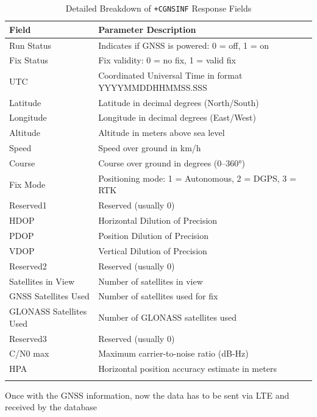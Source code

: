\begin{table}[h!]
    \centering
    \small
    \begin{tabular}{l|l}
        \textbf{Field} & \textbf{Parameter Description} \\
        \hline
        \arrayrulecolor[gray]{0.85}
        Run Status & Indicates if GNSS is powered: 0 = off, 1 = on \\
        \hline
        Fix Status & Fix validity: 0 = no fix, 1 = valid fix \\
        \hline
        UTC & Coordinated Universal Time in format YYYYMMDDHHMMSS.SSS \\
        \hline
        Latitude & Latitude in decimal degrees (North/South) \\
        \hline
        Longitude & Longitude in decimal degrees (East/West) \\
        \hline
        Altitude & Altitude in meters above sea level \\
        \hline
        Speed & Speed over ground in km/h \\
        \hline
        Course & Course over ground in degrees (0–360°) \\
        \hline
        Fix Mode & Positioning mode: 1 = Autonomous, 2 = DGPS, 3 = RTK \\
        \hline
        Reserved1 & Reserved (usually 0) \\
        \hline
        HDOP & Horizontal Dilution of Precision \\
        \hline
        PDOP & Position Dilution of Precision \\
        \hline
        VDOP & Vertical Dilution of Precision \\
        \hline
        Reserved2 & Reserved (usually 0) \\
        \hline
        Satellites in View & Number of satellites in view \\
        \hline
        GNSS Satellites Used & Number of satellites used for fix \\
        \hline
        GLONASS Satellites Used & Number of GLONASS satellites used \\
        \hline
        Reserved3 & Reserved (usually 0) \\
        \hline
        C/N0 max & Maximum carrier-to-noise ratio (dB-Hz) \\
        \hline
        HPA & Horizontal position accuracy estimate in meters \\
        \arrayrulecolor{black}
        \end{tabular}
    \caption{Detailed Breakdown of \texttt{+CGNSINF} Response Fields}
\end{table}
Once with the GNSS information, now the data has to be sent via LTE and received by the database 

